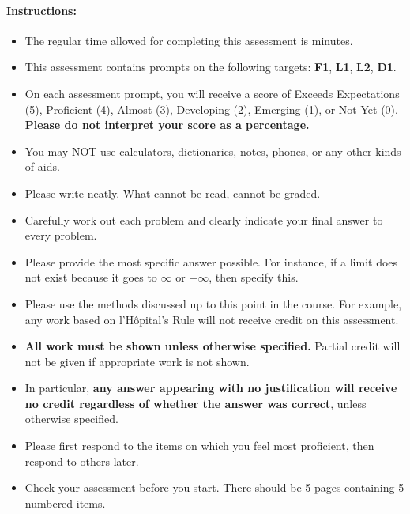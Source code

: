 \documentclass[11pt]{article}
\begin{document}
{%

\paragraph*{Instructions:}

\begin{itemize}
    
    \item The regular time allowed for completing this assessment is  minutes.
    \item This assessment contains prompts on the following targets: {\bf\color{ProcessBlue}F1}, {\bf\color{RoyalBlue}L1}, {\bf\color{RoyalBlue}L2}, {\bf\color{ForestGreen}D1}.
    \item On each assessment prompt, you will receive a score of Exceeds Expectations (5), Proficient (4), Almost (3), Developing (2), Emerging (1), or Not Yet (0). {\bf Please do not interpret your score as a percentage.}
    \item You may NOT use calculators, dictionaries, notes, phones, or any other kinds of aids.
    \item Please write neatly. What cannot be read, cannot be graded.
    \item Carefully work out each problem and clearly indicate your final answer to every problem.
    \item Please provide the most specific answer possible. For instance, if a limit does not exist because it goes to $\infty$ or $-\infty$, then specify this.
    \item Please use the methods discussed up to this point in the course. For example, any work based on l'H\^opital's Rule will not receive credit on this assessment.
    \item \textbf{All work must be shown unless otherwise specified.} Partial credit will not be given if appropriate work is not shown.
    \item In particular, {\bf any answer appearing with no justification will receive no credit regardless of whether the answer was correct}, unless otherwise specified.
    \item Please first respond to the items on which you feel most proficient, then respond to others later.
    \item Check your assessment before you start. There should be 5 pages containing 5 numbered items.
    \end{itemize}
    
    }
\end{document}
